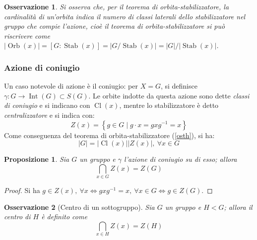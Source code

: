 \documentclass[11pt]{article}
\theoremstyle{style}
\newtheorem{prop}{Proposizione}[section]
\newtheorem{osservazione}{Osservazione}[section]
\numberwithin{equation}{subsection}
\begin{document}
\begin{osservazione}
Si osserva che, per il teorema di orbita-stabilizzatore, la cardinalit\`a di un'orbita indica il numero di classi laterali dello stabilizzatore nel gruppo che compie l'azione, cio\`e il teorema di orbita-stabilizzatore si pu\`o riscrivere come $\lvert \operatorname{Orb} (x) \rvert = [G: \operatorname{Stab} (x)] = \lvert G / \operatorname{Stab} (x) \rvert = \lvert G \rvert / \lvert \operatorname{Stab} (x) \rvert $.
\end{osservazione}


\subsubsection{Azione di coniugio}
 Un caso notevole di azione \`e il coniugio: per $X=G$, si definisce $\gamma : G \to \operatorname{Int} (G) \subset S(G)$.
Le orbite indotte da questa azione sono dette \textit{classi di coniugio} e si indicano con $\operatorname{Cl} (x)$, mentre lo stabilizzatore \`e detto \textit{centralizzatore} e si indica con:
\begin{equation}
	Z(x) = \left\{ g \in G  \mid g \cdot x = gxg^{-1} = x \right\} 
\end{equation}
Come conseguenza del teorema di orbita-stabilizzatore (\ref{osth}), si ha:
\begin{equation}
	\lvert G \rvert  = \lvert \operatorname{Cl} (x)  \rvert  \lvert Z(x) \rvert , \ \forall x \in G
\end{equation}
\begin{prop}
	Sia $G$ un gruppo e $\gamma$ l'azione di coniugio su di esso; allora
	\[
	\bigcap_{x \in G} Z(x) = Z(G)
	\] 
\end{prop}
	\begin{proof}
		Si ha $g \in Z(x), \ \forall x \iff gxg^{-1} =x , \ \forall x \in G \iff g \in Z(G)$.
	\end{proof}
\begin{osservazione}
	[Centro di un sottogruppo]
	Sia $G$ un gruppo e $H < G$; allora il centro di $H$ \`e definito come 
	\[
	\bigcap_{x \in H}  Z(x) = Z(H)
	\] 
\end{osservazione}
\end{document}
